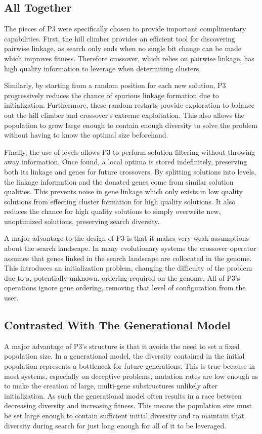 \documentclass{sig-alternate}
\begin{document}
\subsection{All Together}
\label{sec-alltogether}
The pieces of P3 were specifically chosen to provide important complimentary capabilities.  First,
the hill climber provides an efficient tool for discovering pairwise linkage, as
search only ends when no single bit change can be made which improves fitness.
Therefore crossover, which relies on pairwise linkage, has high quality information
to leverage when determining clusters.

Similarly, by starting from a random position for each new solution, P3 progressively reduces
the chance of spurious linkage formation due to initialization.  Furthermore, these random
restarts provide exploration to balance out the hill climber and crossover's extreme
exploitation.  This also allows the population to grow large enough to contain enough
diversity to solve the problem without having to know the optimal size beforehand.

Finally, the use of levels allows P3 to perform solution filtering
without throwing away information.  Once found, a local optima is
stored indefinitely, preserving both its linkage and genes for future
crossovers.  By splitting solutions into levels, the linkage
information and the donated genes come from similar solution
qualities.  This prevents noise in gene linkage which only exists in
low quality solutions from effecting cluster formation for high
quality solutions.  It also reduces the chance for high quality
solutions to simply overwrite new, unoptimized solutions, preserving
search diversity.

  A major advantage to the design of P3 is that it makes very weak
  assumptions about the search landscape.  In many evolutionary
  systems the crossover operator assumes that genes linked in the
  search landscape are collocated in the genome.  This introduces an
  initialization problem, changing the difficulty of the problem due
  to a, potentially unknown, ordering required on the genome.  All of
  P3's operations ignore gene ordering, removing that level of
  configuration from the user.

\subsection{Contrasted With The Generational Model}
A major advantage of P3's structure is that it avoids the need to set
a fixed population size.  In a generational model, the diversity
contained in the initial population represents a bottleneck for future
generations.  This is true because in most systems, especially on
deceptive problems, mutation rates are low enough as to make the
creation of large, multi-gene substructures unlikely after
initialization.  As such the generational model often results in a
race between decreasing diversity and increasing fitness. This means the
population size must be set large enough to contain sufficient initial
diversity and to maintain that diversity during search for just long
enough for all of it to be leveraged.
\end{document}
